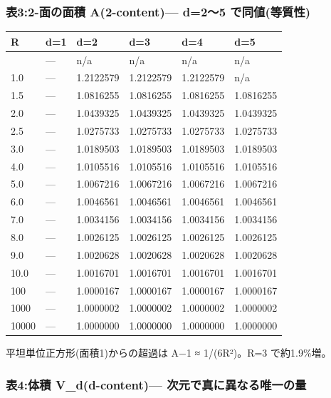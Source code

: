 \documentclass[
]{ltjsarticle}
\newcounter{none} %
\begin{document}
\subsubsection{表3:2-面の面積 A(2-content)--- d=2〜5
で同値(等質性)}\label{ux886832-ux9762ux306eux9762ux7a4d-a2-content-d25-ux3067ux540cux5024ux7b49ux8ceaux6027}

{\def\LTcaptype{none} %
\begin{longtable}[]{@{}llllll@{}}
\toprule\noalign{}
R & d=1 & d=2 & d=3 & d=4 & d=5 \\
\midrule\noalign{}
\endhead
\bottomrule\noalign{}
\endlastfoot
0.5 & --- & n/a & n/a & n/a & n/a \\
1.0 & --- & 1.2122579 & 1.2122579 & 1.2122579 & n/a \\
1.5 & --- & 1.0816255 & 1.0816255 & 1.0816255 & 1.0816255 \\
2.0 & --- & 1.0439325 & 1.0439325 & 1.0439325 & 1.0439325 \\
2.5 & --- & 1.0275733 & 1.0275733 & 1.0275733 & 1.0275733 \\
3.0 & --- & 1.0189503 & 1.0189503 & 1.0189503 & 1.0189503 \\
4.0 & --- & 1.0105516 & 1.0105516 & 1.0105516 & 1.0105516 \\
5.0 & --- & 1.0067216 & 1.0067216 & 1.0067216 & 1.0067216 \\
6.0 & --- & 1.0046561 & 1.0046561 & 1.0046561 & 1.0046561 \\
7.0 & --- & 1.0034156 & 1.0034156 & 1.0034156 & 1.0034156 \\
8.0 & --- & 1.0026125 & 1.0026125 & 1.0026125 & 1.0026125 \\
9.0 & --- & 1.0020628 & 1.0020628 & 1.0020628 & 1.0020628 \\
10.0 & --- & 1.0016701 & 1.0016701 & 1.0016701 & 1.0016701 \\
100 & --- & 1.0000167 & 1.0000167 & 1.0000167 & 1.0000167 \\
1000 & --- & 1.0000002 & 1.0000002 & 1.0000002 & 1.0000002 \\
10000 & --- & 1.0000000 & 1.0000000 & 1.0000000 & 1.0000000 \\
\end{longtable}
}

平坦単位正方形(面積1)からの超過は A−1 ≈ 1/(6R²)。R=3 で約1.9\%増。

\subsubsection{表4:体積 V\_d(d-content)---
次元で真に異なる唯一の量}\label{ux88684ux4f53ux7a4d-v_dd-content-ux6b21ux5143ux3067ux771fux306bux7570ux306aux308bux552fux4e00ux306eux91cf}
\end{document}
